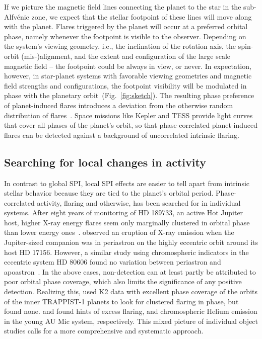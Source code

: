 \documentclass[twocolumn]{aastex631}
\begin{document}
If we picture the magnetic field lines connecting the planet to the star in the sub-Alfv\'enic zone, we expect that the stellar footpoint of these lines will move along with the planet. Flares triggered by the planet will occur at a preferred orbital phase, namely whenever the footpoint is visible to the observer. Depending on the system's viewing geometry, i.e., the inclination of the rotation axis, the spin-orbit (mis-)alignment, and the extent and configuration of the large scale magnetic field -- the footpoint could be always in view, or never. In expectation, however, in star-planet systems with favorable viewing geometries and magnetic field strengths and configurations, the footpoint visibility will be modulated in phase with the planetary orbit~(Fig.~\ref{fig:sketch}). The resulting phase preference of planet-induced flares introduces a deviation from the otherwise random distribution of flares~\citep[see, e.g.,][]{doyle2018investigating,feinstein2020flare,howard2021evryflare}. Space missions like Kepler and TESS provide light curves that cover all phases of the planet's orbit, so that phase-correlated planet-induced flares can be detected against a background of uncorrelated intrinsic flaring. 


\subsection{Searching for local changes in activity}
\label{sec:intro:local}
In contrast to global SPI, local SPI effects are easier to tell apart from intrinsic stellar behavior because they are tied to the planet's orbital period. 
Phase-correlated activity, flaring and otherwise, has been searched for in individual systems. After eight years of monitoring of HD 189733, an active Hot Jupiter host, higher X-ray energy flares seem only marginally clustered in orbital phase than lower energy ones~\citep{pillitteri2022xray}. \citet{maggio2015coordinated} observed an eruption of X-ray emission when the Jupiter-sized companion was in periastron on the highly eccentric orbit around its host HD 17156. However, a similar study using chromospheric indicators in the eccentric system HD 80606 found no variation between periastron and apoastron~\citep{figueira2016activity}. In the above cases, non-detection can at least partly be attributed to poor orbital phase coverage, which also limits the significance of any positive detection. Realizing this, \citet{fischer2019timevariable} used K2 data with excellent phase coverage of the orbits of the inner \mbox{TRAPPIST-1} planets to look for clustered flaring in phase, but found none. \citet{ilin2022searching} and \citet{klein2022one} found hints of excess flaring, and chromospheric Helium emission in the young AU Mic system, respectively. This mixed picture of individual object studies calls for a more comprehensive and systematic approach.
\end{document}
